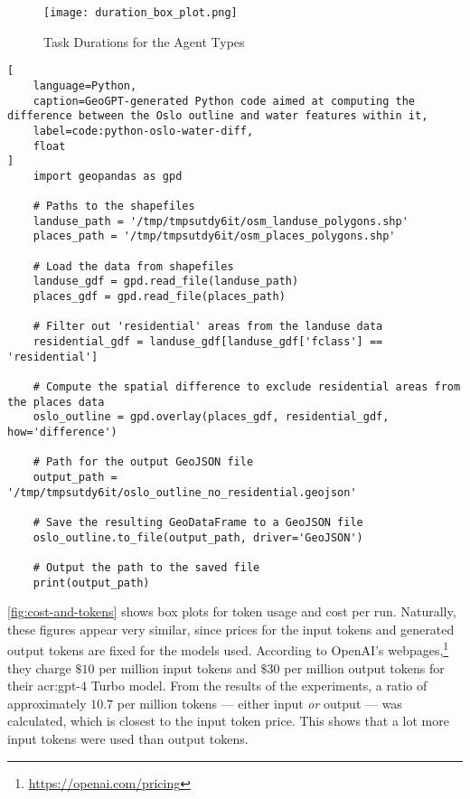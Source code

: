 \begin{figure}[htbp]
    \centering
    \texttt{[image: duration\_box\_plot.png]}
    \caption{Task Durations for the Agent Types}
    \label{fig:duration-box-plot}
\end{figure}

\FloatBarrier

\begin{lstlisting}[
    language=Python,
    caption=GeoGPT-generated Python code aimed at computing the difference between the Oslo outline and water features within it,
    label=code:python-oslo-water-diff,
    float
]
    import geopandas as gpd

    # Paths to the shapefiles
    landuse_path = '/tmp/tmpsutdy6it/osm_landuse_polygons.shp'
    places_path = '/tmp/tmpsutdy6it/osm_places_polygons.shp'
    
    # Load the data from shapefiles
    landuse_gdf = gpd.read_file(landuse_path)
    places_gdf = gpd.read_file(places_path)
    
    # Filter out 'residential' areas from the landuse data
    residential_gdf = landuse_gdf[landuse_gdf['fclass'] == 'residential']
     
    # Compute the spatial difference to exclude residential areas from the places data
    oslo_outline = gpd.overlay(places_gdf, residential_gdf, how='difference')
    
    # Path for the output GeoJSON file
    output_path = '/tmp/tmpsutdy6it/oslo_outline_no_residential.geojson'
    
    # Save the resulting GeoDataFrame to a GeoJSON file
    oslo_outline.to_file(output_path, driver='GeoJSON')
    
    # Output the path to the saved file
    print(output_path)    
\end{lstlisting}

\autoref{fig:cost-and-tokens} shows box plots for token usage and cost per run. Naturally, these figures appear very similar, since prices for the input tokens and generated output tokens are fixed for the models used. According to OpenAI's webpages,\footnote{\url{https://openai.com/pricing}} they charge $\$10$ per million input tokens and $\$30$ per million output tokens for their \acrshort{acr:gpt}-4 Turbo model. From the results of the experiments, a ratio of approximately $10.7$ per million tokens --- either input \textit{or} output --- was calculated, which is closest to the input token price. This shows that a lot more input tokens were used than output tokens.

